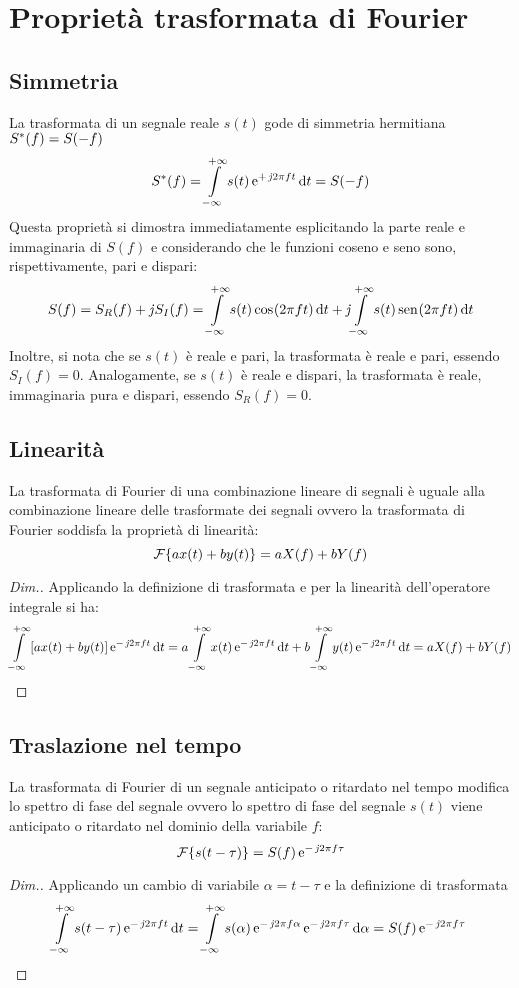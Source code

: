 \section{Proprietà trasformata di Fourier}
\subsection{Simmetria}
La trasformata di un segnale reale $s(t)$ gode di simmetria hermitiana ${S}^\ast(f)=S(-f)$
\begin{equation}
	{S}^\ast(f)=\int\limits_{-\infty}^{+\infty}{s(t)\operatorname{e}^{+\operatorname{\mathit{j}\!} 2\pi f t}}{\,\mathop{}\!\mathrm{d}{t}}=S(-f)
\end{equation}
Questa proprietà si dimostra immediatamente esplicitando la parte reale e immaginaria di $S(f)$ e considerando che le funzioni coseno e seno sono, rispettivamente, pari e dispari: 
\[
	S(f)=S_R(f)+\operatorname{\mathit{j}\!} S_I(f)=\int\limits_{-\infty}^{+\infty}{s(t)\,{\operatorname{cos}}^{}\!\left({2\pi f t}\right)}{\,\mathop{}\!\mathrm{d}{t}}+\operatorname{\mathit{j}\!}\int\limits_{-\infty}^{+\infty}{s(t)\,{\operatorname{sen}}^{}\!\left({2\pi f t}\right)}{\,\mathop{}\!\mathrm{d}{t}}
\]
Inoltre, si nota che se $s(t)$ è reale e pari, la trasformata è reale e pari, essendo $S_I(f)=0$.
Analogamente, se $s(t)$ è reale e dispari, la trasformata è reale, immaginaria pura e dispari, essendo $S_R(f)=0$.

\subsection{Linearità}
La trasformata di Fourier di una combinazione lineare di segnali è uguale alla combinazione lineare delle trasformate dei segnali ovvero la trasformata di Fourier soddisfa la proprietà di linearità:
\begin{equation}
	\operatorname{\mathcal{F}}\!\left\lbrace{a x(t)+b y(t)}\right\rbrace= a X(f)+b Y(f)
\end{equation}

\begin{proof}[Dim.]
Applicando la definizione di trasformata e per la linearità dell'operatore integrale si ha:
\[
	 \int\limits_{-\infty}^{+\infty}{\left[a x(t)+b y(t)\right]\operatorname{e}^{-\operatorname{\mathit{j}\!} 2\pi f t}}{\,\mathop{}\!\mathrm{d}{t}}= a\int\limits_{-\infty}^{+\infty}{x(t)\operatorname{e}^{-\operatorname{\mathit{j}\!} 2\pi f t}}{\,\mathop{}\!\mathrm{d}{t}}+b\int\limits_{-\infty}^{+\infty}{y(t)\operatorname{e}^{-\operatorname{\mathit{j}\!} 2\pi f t}}{\,\mathop{}\!\mathrm{d}{t}}=a X(f)+b Y(f)
\qedhere
\]
\end{proof}

\subsection{Traslazione nel tempo}
La trasformata di Fourier di un segnale anticipato o ritardato nel tempo modifica lo spettro di fase del segnale ovvero lo spettro di fase del segnale $s(t)$ viene anticipato o ritardato nel dominio della variabile $f$:
\begin{equation}
\label{eq:trasf_Fourier_trasl}
	\operatorname{\mathcal{F}}\!\left\lbrace{s(t-\tau)}\right\rbrace= S(f)\operatorname{e}^{-\operatorname{\mathit{j}\!} 2\pi f \tau}
\end{equation}
\begin{proof}[Dim.]
Applicando un cambio di variabile $\alpha=t-\tau$ e la definizione di trasformata
\[
	\int\limits_{-\infty}^{+\infty}{s(t-\tau)\operatorname{e}^{-\operatorname{\mathit{j}\!} 2\pi f t}}{\,\mathop{}\!\mathrm{d}{t}}=
	\int\limits_{-\infty}^{+\infty}{s(\alpha)\operatorname{e}^{-\operatorname{\mathit{j}\!} 2\pi f\alpha}\operatorname{e}^{-\operatorname{\mathit{j}\!} 2\pi f\tau}}{\,\mathop{}\!\mathrm{d}{\alpha}}=S(f)\operatorname{e}^{-\operatorname{\mathit{j}\!} 2\pi f\tau}
\qedhere
\]
\end{proof}

